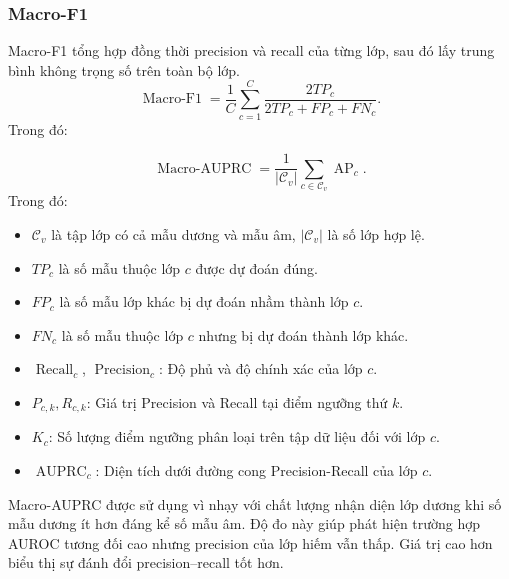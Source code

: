 \subsubsection{Macro-F1}
Macro-F1 tổng hợp đồng thời precision và recall của từng lớp, sau đó lấy trung bình không trọng số trên toàn bộ lớp.
\begin{equation}\operatorname{Macro\text{-}F1}=\frac{1}{C}\sum_{c=1}^{C}\frac{2TP_c}{2TP_c+FP_c+FN_c}.\label{eq:ch4_macro_f1}\end{equation}
Trong đó:

\begin{equation}
    \operatorname{Macro\text{-}AUPRC}=\frac{1}{\left|\mathcal{C}_{v}\right|}\sum_{c\in\mathcal{C}_{v}}\operatorname{AP}_{c}.
    \label{eq:ch4_macro_auprc}
\end{equation}
Trong đó:
\begin{itemize}
    \item $\mathcal{C}_{v}$ là tập lớp có cả mẫu dương và mẫu âm, $|\mathcal{C}_{v}|$ là số lớp hợp lệ.
    \item $TP_c$ là số mẫu thuộc lớp $c$ được dự đoán đúng.
    \item $FP_c$ là số mẫu lớp khác bị dự đoán nhầm thành lớp $c$.
    \item $FN_c$ là số mẫu thuộc lớp $c$ nhưng bị dự đoán thành lớp khác.
    \item $\operatorname{Recall}_c$, $\operatorname{Precision}_c$: Độ phủ và độ chính xác của lớp $c$.
    \item $P_{c,k}, R_{c,k}$: Giá trị Precision và Recall tại điểm ngưỡng thứ $k$.
    \item $K_c$: Số lượng điểm ngưỡng phân loại trên tập dữ liệu đối với lớp $c$.
    \item $\operatorname{AUPRC}_c$: Diện tích dưới đường cong Precision-Recall của lớp $c$.
\end{itemize}
Macro-AUPRC được sử dụng vì nhạy với chất lượng nhận diện lớp dương khi số mẫu dương ít hơn đáng kể số mẫu âm. Độ đo này giúp phát hiện trường hợp AUROC tương đối cao nhưng precision của lớp hiếm vẫn thấp. Giá trị cao hơn biểu thị sự đánh đổi precision--recall tốt hơn.
